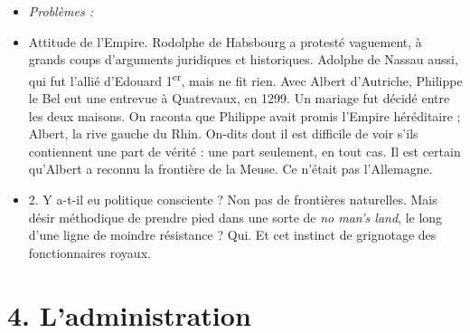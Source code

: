 \documentclass[french,twoside]{book} %
\newlength{\listmod}
\newcommand{\listhead}[1]{\hspace{-1\listmod}\emph{#1}}
\newcommand\chapteropen{} %
\newcommand\chaptercont{} %
\newcommand\chapterclose{} %
\renewcommand\chapteropen{} %
\renewcommand\chaptercont{} %
\renewcommand\chapterclose{} %
\begin{document}
\begin{enumerate}[itemsep=\baselineskip,]
\begin{itemize}[itemsep=0pt,]
\item[]\listhead{Problèmes :}
\item Attitude de l’Empire. Rodolphe de Habsbourg a protesté vaguement, à grands coups d’arguments juridiques et historiques. Adolphe de Nassau aussi, qui fut l’allié d’Edouard 1\textsuperscript{er}, mais ne fit rien. Avec Albert d’Autriche, Philippe le Bel eut une entrevue à Quatrevaux, en 1299. Un mariage fut décidé entre les deux maisons. On raconta que Philippe avait promis l’Empire héréditaire ; Albert, la rive gauche du Rhin. On-dits dont il est difficile de voir s’ils contiennent une part de vérité : une part seulement, en tout cas. Il est certain qu’Albert a reconnu la frontière de la Meuse. Ce n’était pas l’Allemagne.
\item 2. Y a-t-il eu politique consciente ? Non pas de frontières naturelles. Mais désir méthodique de prendre pied dans une sorte de {\itshape no man’s land}, le long d’une ligne de moindre résistance ? Qui. Et cet instinct de grignotage des fonctionnaires royaux.
\end{itemize}


\end{enumerate}\chapterclose


\chapteropen
\chapter[4. L’administration]{\textsc{4. }L’administration}
\label{c04}

\chaptercont
\end{document}
